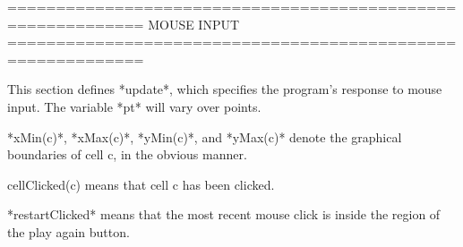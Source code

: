 \documentclass{led_doc}
\begin{document}
\begin{ledCmnt}
============================================================
MOUSE INPUT
============================================================

This section defines *update*, which specifies the program's response to mouse input. The variable *pt* will vary over points.

*xMin(c)*, *xMax(c)*, *yMin(c)*, and *yMax(c)* denote the graphical boundaries of cell c, in the obvious manner.
\end{ledCmnt}

\begin{ledDef}
\end{ledDef}

\begin{ledDef}
\end{ledDef}

\begin{ledDef}
\end{ledDef}

\begin{ledDef}
\end{ledDef}

\begin{ledCmnt}
cellClicked(c) means that cell c has been clicked.
\end{ledCmnt}

\begin{ledDef}
\end{ledDef}

\begin{ledCmnt}
*restartClicked* means that the most recent mouse click is inside the region of the play again button.
\end{ledCmnt}

\begin{ledDef}
\end{ledDef}
\end{document}
